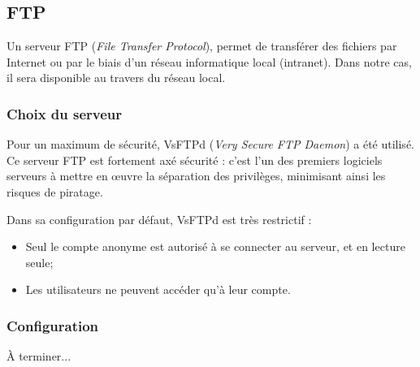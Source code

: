 \subsection{FTP}
\label{subsec:ftp}

Un serveur FTP (\emph{File Transfer Protocol}), permet de transférer des
fichiers par Internet ou par le biais d'un réseau informatique local
(intranet). Dans notre cas, il sera disponible au travers du réseau local.

\subsubsection{Choix du serveur}
\label{subsubsec:choix-serveur}

Pour un maximum de sécurité, VsFTPd (\emph{Very Secure FTP Daemon}) a été utilisé. \\
Ce serveur FTP est fortement axé sécurité : c'est l'un des premiers logiciels
serveurs à mettre en \oe{}uvre la séparation des privilèges, minimisant ainsi les
risques de piratage.

Dans sa configuration par défaut, VsFTPd est très restrictif :

\begin{itemize}
    \item Seul le compte anonyme est autorisé à se connecter au serveur, et en
      lecture seule;

    \item Les utilisateurs ne peuvent accéder qu'à leur compte.
\end{itemize}

\subsubsection{Configuration}
\label{subsubsec:config}

À terminer...

